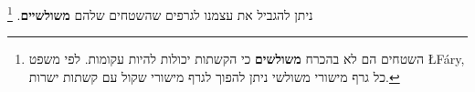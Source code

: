 %
%
%
%
%
%
ניתן להגביל את עצמנו לגרפים שהשטחים שלהם
\textbf{משולשיים}.%
\footnote{%
השטחים הם לא בהכרח 
\textbf{משולשים}
כי הקשתות יכולות להיות עקומות. לפי משפט
\L{F\'{a}ry},
כל גרף מישורי משולשי ניתן להפוך לגרף מישורי שקול עם קשתות ישרות.%
}

